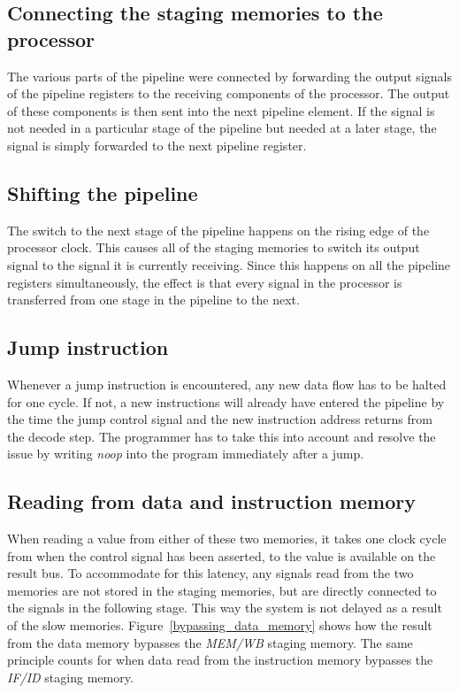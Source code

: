 \subsection{Connecting the staging memories to the processor} %
\label{sub:connecting_the_staging_memories_to_the_processor}
The various parts of the pipeline were connected by forwarding the output signals of the pipeline registers to the receiving components of the processor. The output of these components is then sent into the next pipeline element. If the signal is not needed in a particular stage of the pipeline but needed at a later stage, the signal is simply forwarded to the next pipeline register.

\subsection{Shifting the pipeline} %
\label{sub:shifting_the_pipeline}
The switch to the next stage of the pipeline happens on the rising edge of the processor clock. This causes all of the staging memories to switch its output signal to the signal it is currently receiving. Since this happens on all the pipeline registers simultaneously, the effect is that every signal in the processor is transferred from one stage in the pipeline to the next.


\subsection{Jump instruction}
\label{sub:jump_instruction}
Whenever a jump instruction is encountered, any new data flow has to be halted for one cycle. If not, a new instructions will already have entered the pipeline by the time the jump control signal and the new instruction address returns from the decode step. The programmer has to take this into account and resolve the issue by writing \emph{noop} into the program immediately after a jump.

\subsection{Reading from data and instruction memory}
\label{sub:reading_from_data_and_instruction_memory}
When reading a value from either of these two memories, it takes one clock cycle from when the control signal has been asserted, to the value is available on the result bus. To accommodate for this latency, any signals read from the two memories are not stored in the staging memories, but are directly connected to the signals in the following stage. This way the system is not delayed as a result of the slow memories. Figure~\ref{bypassing_data_memory} shows how the result from the data memory bypasses the \emph{MEM/WB} staging memory. The same principle counts for when data read from the instruction memory bypasses the \emph{IF/ID} staging memory.

